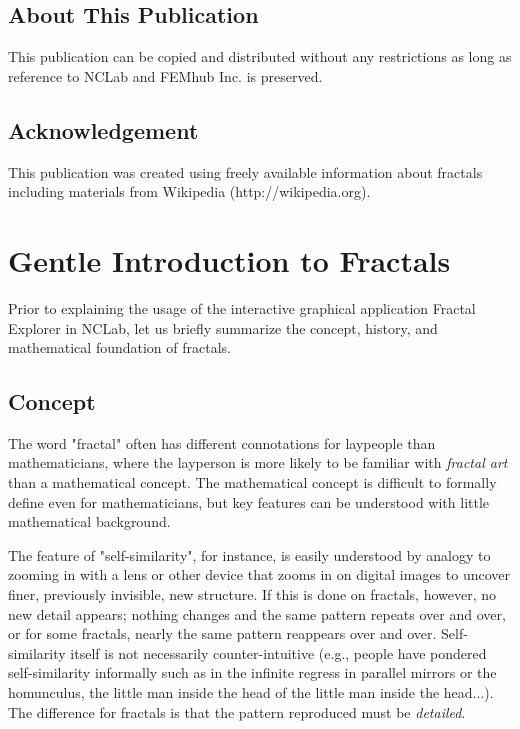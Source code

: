 \documentclass[article,A4,12pt]{llncs}
\begin{document}
\subsection*{About This Publication}
This publication can be copied and distributed without any restrictions
as long as reference to NCLab and FEMhub Inc. is preserved.

\subsection*{Acknowledgement}
This publication was created using freely available information about fractals
including materials from Wikipedia (http://wikipedia.org).

\normalsize

\newpage

\pagestyle{plain}
\setcounter{page}{1}

\section*{Gentle Introduction to Fractals}

Prior to explaining the usage of the interactive graphical application 
Fractal Explorer in NCLab, let us briefly summarize the concept, history, 
and mathematical foundation of fractals.

\subsection*{Concept}

The word "fractal" often has different connotations for laypeople than mathematicians, where 
the layperson is more likely to be familiar with {\em fractal art} than a mathematical concept. 
The mathematical concept is difficult to formally define even for mathematicians, but key 
features can be understood with little mathematical background.

The feature of "self-similarity", for instance, is easily understood by analogy to zooming in 
with a lens or other device that zooms in on digital images to uncover finer, previously 
invisible, new structure. If this is done on fractals, however, no new detail appears; 
nothing changes and the same pattern repeats over and over, or for some fractals, nearly 
the same pattern reappears over and over. Self-similarity itself is not necessarily counter-intuitive 
(e.g., people have pondered self-similarity informally such as in the infinite regress in 
parallel mirrors or the homunculus, the little man inside the head of the little man inside 
the head...). The difference for fractals is that the pattern reproduced must be {\em detailed}.
\end{document}
